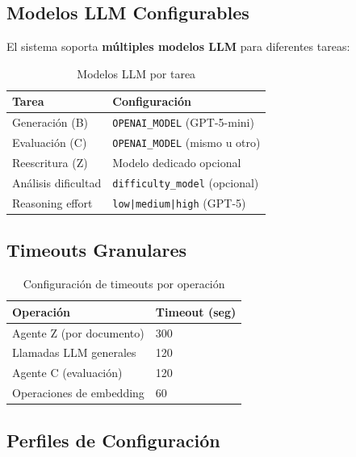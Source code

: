 \documentclass[10pt,twocolumn,letterpaper]{article}
\begin{document}
\subsection{Modelos LLM Configurables}

El sistema soporta \textbf{m\'ultiples modelos LLM} para diferentes tareas:

\begin{table}[H]
\centering
\caption{Modelos LLM por tarea}
\label{tab:models}
\scriptsize
\begin{tabularx}{\columnwidth}{lX}
\toprule
\textbf{Tarea} & \textbf{Configuraci\'on} \\
\midrule
Generaci\'on (B) & \texttt{OPENAI\_MODEL} (GPT-5-mini) \\
Evaluaci\'on (C) & \texttt{OPENAI\_MODEL} (mismo u otro) \\
Reescritura (Z) & Modelo dedicado opcional \\
An\'alisis dificultad & \texttt{difficulty\_model} (opcional) \\
Reasoning effort & \texttt{low|medium|high} (GPT-5) \\
\bottomrule
\end{tabularx}
\end{table}

\subsection{Timeouts Granulares}

\begin{table}[H]
\centering
\caption{Configuraci\'on de timeouts por operaci\'on}
\label{tab:timeouts}
\scriptsize
\begin{tabularx}{\columnwidth}{lX}
\toprule
\textbf{Operaci\'on} & \textbf{Timeout (seg)} \\
\midrule
Agente Z (por documento) & 300 \\
Llamadas LLM generales & 120 \\
Agente C (evaluaci\'on) & 120 \\
Operaciones de embedding & 60 \\
\bottomrule
\end{tabularx}
\end{table}

\subsection{Perfiles de Configuraci\'on}
\end{document}
